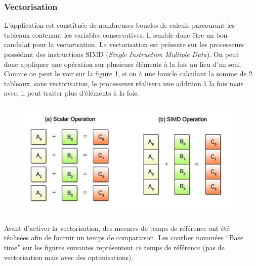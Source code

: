 \subsubsection{Vectorisation}\label{fig:vecto}
L'application est constituée de nombreuses boucles de calculs parcourant les tableaux contenant les variables conservatives. Il semble donc être un bon candidat pour la vectorisation. La vectorisation est présente sur les processeurs possédant des instructions SIMD (\textit{Single Instruction Multiple Data}). On peut donc appliquer une opération sur plusieurs éléments à la fois au lieu d'un seul. Comme on peut le voir sur la figure \ref{fig:simd}, si on à une boucle calculant la somme de 2 tableaux, sans vectorisation, le processeurs réalisera une addition à la fois mais avec, il peut traiter plus d'éléments à la fois.

\begin{figure}[ht]
  \centering
  \includegraphics[scale=1]{figures/simd.jpg}
  \caption{\label{fig:simd} }
\end{figure}


Avant d'activer la vectorisation, des mesures de temps de référence ont été réalisées afin de fournir un temps de comparaison. Les courbes nommées ``Base time'' sur les figures suivantes représentent ce temps de référence (pas de vectorisation mais avec des optimisations).


